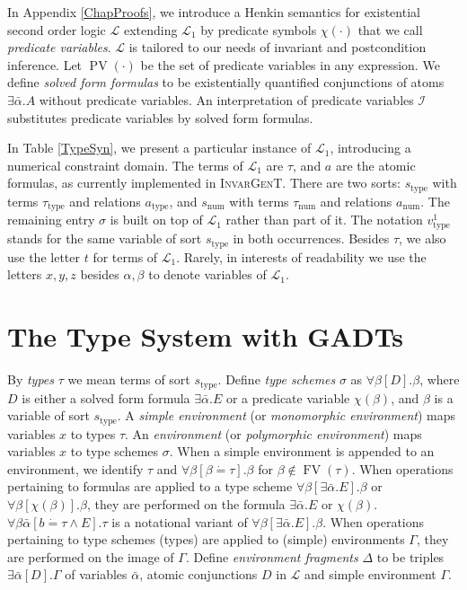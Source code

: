 \documentclass{article}
\newcommand{\cdummy}{\cdot}
\newcommand{\nin}{\not\in}
\newcommand{\tmem}[1]{{\em #1\/}}
\newcommand{\tmname}[1]{\textsc{#1}}
\newcommand{\tmop}[1]{\ensuremath{\operatorname{#1}}}
\begin{document}
In Appendix \ref{ChapProofs}, we introduce a Henkin semantics for existential
second order logic $\mathcal{L}$ extending $\mathcal{L}_1$ by predicate
symbols $\chi (\cdummy)$ that we call {\tmem{predicate variables}}.
$\mathcal{L}$ is tailored to our needs of invariant and postcondition
inference. Let $\tmop{PV} (\cdummy)$ be the set of predicate variables in any
expression. We define {\tmem{solved form formulas}} to be existentially
quantified conjunctions of atoms $\exists \bar{\alpha} .A$ without predicate
variables. An interpretation of predicate variables $\mathcal{I}$ substitutes
predicate variables by solved form formulas.

In Table \ref{TypeSyn}, we present a particular instance of $\mathcal{L}_1$,
introducing a numerical constraint domain. The terms of $\mathcal{L}_1$ are
$\tau$, and $a$ are the atomic formulas, as currently implemented in
{\tmname{InvarGenT}}. There are two sorts: $s_{\tmop{type}}$ with terms
$\tau_{\tmop{type}}$ and relations $a_{\tmop{type}}$, and $s_{\tmop{num}}$
with terms $\tau_{\tmop{num}}$ and relations $a_{\tmop{num}}$. The remaining
entry $\sigma$ is built on top of $\mathcal{L}_1$ rather than part of it. The
notation $v_{\tmop{type}}^1$ stands for the same variable of sort
$s_{\tmop{type}}$ in both occurrences. Besides $\tau$, we also use the letter
$t$ for terms of $\mathcal{L}_1$. Rarely, in interests of readability we use
the letters $x, y, z$ besides $\alpha, \beta$ to denote variables of
$\mathcal{L}_1$.

\section{The Type System with GADTs}\label{TypSys}

By {\tmem{types}} $\tau$ we mean terms of sort $s_{\tmop{type}}$. Define
{\tmem{type schemes}} $\sigma$ as $\forall \beta [D] . \beta$, where $D$ is
either a solved form formula $\exists \bar{\alpha} .E$ or a predicate variable
$\chi (\beta)$, and $\beta$ is a variable of sort $s_{\tmop{type}}$. A
{\tmem{simple environment}} (or {\tmem{monomorphic environment}}) maps
variables $x$ to types $\tau$. An {\tmem{environment}} (or {\tmem{polymorphic
environment}}) maps variables $x$ to type schemes $\sigma$. When a simple
environment is appended to an environment, we identify $\tau$ and $\forall
\beta [\beta \dot{=} \tau] . \beta$ for $\beta \nin \tmop{FV} (\tau)$. When
operations pertaining to formulas are applied to a type scheme $\forall \beta
[\exists \bar{\alpha} .E] . \beta$ or $\forall \beta [\chi (\beta)] . \beta$,
they are performed on the formula $\exists \bar{\alpha} .E$ or $\chi (\beta)$.
$\forall \beta \bar{\alpha} [b \dot{=} \tau \wedge E] . \tau$ is a notational
variant of $\forall \beta [\exists \bar{\alpha} .E] . \beta$. When operations
pertaining to type schemes (types) are applied to (simple) environments
$\Gamma$, they are performed on the image of $\Gamma$. Define
{\tmem{environment fragments}} $\Delta$ to be triples $\exists \bar{\alpha}
[D] . \Gamma$ of variables $\bar{\alpha}$, atomic conjunctions $D$ in
$\mathcal{L}$ and simple environment $\Gamma$.
\end{document}
